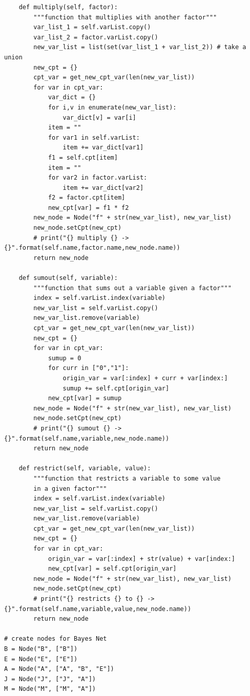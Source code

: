 \documentclass[a4paper, 11pt]{article}
\begin{document}
\begin{lstlisting}
    def multiply(self, factor):
        """function that multiplies with another factor"""
        var_list_1 = self.varList.copy()
        var_list_2 = factor.varList.copy()
        new_var_list = list(set(var_list_1 + var_list_2)) # take a union
        new_cpt = {}
        cpt_var = get_new_cpt_var(len(new_var_list))
        for var in cpt_var:
            var_dict = {}
            for i,v in enumerate(new_var_list):
                var_dict[v] = var[i]
            item = ""
            for var1 in self.varList:
                item += var_dict[var1]
            f1 = self.cpt[item]
            item = ""
            for var2 in factor.varList:
                item += var_dict[var2]
            f2 = factor.cpt[item]
            new_cpt[var] = f1 * f2
        new_node = Node("f" + str(new_var_list), new_var_list)
        new_node.setCpt(new_cpt)
        # print("{} multiply {} -> {}".format(self.name,factor.name,new_node.name))
        return new_node

    def sumout(self, variable):
        """function that sums out a variable given a factor"""
        index = self.varList.index(variable)
        new_var_list = self.varList.copy()
        new_var_list.remove(variable)
        cpt_var = get_new_cpt_var(len(new_var_list))
        new_cpt = {}
        for var in cpt_var:
            sumup = 0
            for curr in ["0","1"]:
                origin_var = var[:index] + curr + var[index:]
                sumup += self.cpt[origin_var]
            new_cpt[var] = sumup
        new_node = Node("f" + str(new_var_list), new_var_list)
        new_node.setCpt(new_cpt)
        # print("{} sumout {} -> {}".format(self.name,variable,new_node.name))
        return new_node

    def restrict(self, variable, value):
        """function that restricts a variable to some value
        in a given factor"""
        index = self.varList.index(variable)
        new_var_list = self.varList.copy()
        new_var_list.remove(variable)
        cpt_var = get_new_cpt_var(len(new_var_list))
        new_cpt = {}
        for var in cpt_var:
            origin_var = var[:index] + str(value) + var[index:]
            new_cpt[var] = self.cpt[origin_var]
        new_node = Node("f" + str(new_var_list), new_var_list)
        new_node.setCpt(new_cpt)
        # print("{} restricts {} to {} -> {}".format(self.name,variable,value,new_node.name))
        return new_node

# create nodes for Bayes Net
B = Node("B", ["B"])
E = Node("E", ["E"])
A = Node("A", ["A", "B", "E"])
J = Node("J", ["J", "A"])
M = Node("M", ["M", "A"])


\end{lstlisting}
\end{document}
